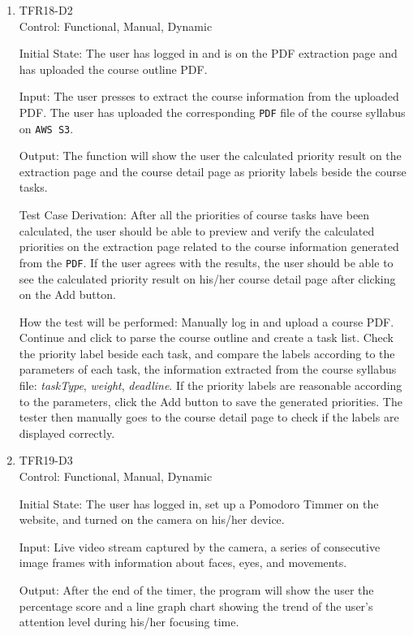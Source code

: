 \documentclass[12pt, titlepage]{article}
\begin{document}
\begin{enumerate}
  \item{TFR18-D2\\}
  Control: Functional, Manual, Dynamic
            
  Initial State: The user has logged in and is on the PDF extraction page and has uploaded the course outline PDF.
            
  Input: The user presses to extract the course information from the uploaded PDF. The user has uploaded the corresponding \texttt{PDF} file of the course syllabus on \texttt{AWS S3}.
            
  Output: 
  The function will show the user the calculated priority result on the extraction page and the course detail page as priority labels beside the course tasks. 
  
  Test Case Derivation: After all the priorities of course tasks have been calculated, the user should be able to preview and verify the calculated priorities on the extraction page related to the course information generated from the \texttt{PDF}. If the user agrees with the results, the user should be able to see the calculated priority result on his/her course detail page after clicking on the Add button.
  
  How the test will be performed: Manually log in and upload a course PDF. Continue and click to parse the course outline and create a task list. Check the priority label beside each task, and compare the labels according to the parameters of each task, the information extracted from the course syllabus file: \textit{taskType}, \textit{weight}, \textit{deadline}. If the priority labels are reasonable according to the parameters, click the Add button to save the generated priorities. The tester then manually goes to the course detail page to check if the labels are displayed correctly.

  \item{TFR19-D3\\} 
  Control: Functional, Manual, Dynamic
            
  Initial State: The user has logged in, set up a Pomodoro Timmer on the website, and turned on the camera on his/her device.
            
  Input: Live video stream captured by the camera, a series of consecutive image frames with information about faces, eyes, and movements.
            
  Output: After the end of the timer, the program will show the user the percentage score and a line graph chart showing the trend of the user's attention level during his/her focusing time.
  

\end{enumerate}
\end{document}
